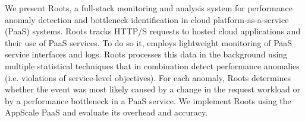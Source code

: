 We present Roots, a full-stack monitoring and analysis system
for performance anomaly detection and bottleneck identification
in cloud platform-as-a-service (PaaS) systems.  Roots tracks 
HTTP/S requests to hosted cloud applications and their use of PaaS services.
To do so it, employs lightweight monitoring of PaaS service interfaces
and logs.  Roots processes this data in the background using multiple
statistical techniques that in combination detect performance
anomalies (i.e. violations of service-level objectives). For each anomaly,
Roots determines whether the event was most likely caused by a change in
the request workload or by a performance bottleneck in a PaaS service.
We implement Roots using the AppScale PaaS and evaluate its overhead
and accuracy.


